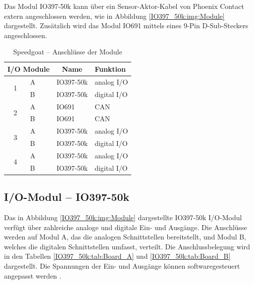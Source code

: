 Das Modul IO397-50k kann über ein Sensor-Aktor-Kabel von Phoenix Contact extern angeschlossen werden, wie in Abbildung \ref{IO397_50k:img:Module} dargestellt.
Zusätzlich wird das Modul IO691 mittels eines 9-Pin D-Sub-Steckers angeschlossen.
\pagebreak[1]
\begin{table}[!ht]
	\centering
	\caption{Speedgoat – Anschlüsse der Module}
	\label{speedgoat:tab:Module}
	\begin{tabular}{clll}
		\hline
		\multicolumn{2}{c}{\textbf{I/O Module}} & \multicolumn{1}{c}{\textbf{Name}} & \textbf{Funktion}               \\ \hline
		\multirow{2}{*}{1}                      & \multicolumn{1}{l|}{A}            & IO397-50k         & analog I/O  \\
		                                        & \multicolumn{1}{l|}{B}            & IO397-50k         & digital I/O \\ \hline
		\multirow{2}{*}{2}                      & \multicolumn{1}{l|}{A}            & IO691             & CAN         \\
		                                        & \multicolumn{1}{l|}{B}            & IO691             & CAN         \\ \hline
		\multirow{2}{*}{3}                      & \multicolumn{1}{l|}{A}            & IO397-50k         & analog I/O  \\
		                                        & \multicolumn{1}{l|}{B}            & IO397-50k         & digital I/O \\ \hline
		\multirow{2}{*}{4}                      & \multicolumn{1}{l|}{A}            & IO397-50k         & analog I/O  \\
		                                        & \multicolumn{1}{l|}{B}            & IO397-50k         & digital I/O \\ \hline
	\end{tabular}
\end{table}
\pagebreak[4]




\subsection{I/O-Modul – IO397-50k}
\label{section:IO397_50k}

Das in Abbildung \ref{IO397_50k:img:Module} dargestellte IO397-50k I/O-Modul verfügt über zahlreiche analoge und digitale Ein- und Ausgänge. Die Anschlüsse werden auf Modul A, das die analogen Schnittstellen bereitstellt, und Modul B, welches die digitalen Schnittstellen umfasst, verteilt. Die Anschlussbelegung wird in den Tabellen \ref{IO397_50k:tab:Board_A} und \ref{IO397_50k:tab:Board_B} dargestellt. Die Spannungen der Ein- und Ausgänge können softwaregesteuert angepasst werden \cite{speedgoat:IO397_50k}.

